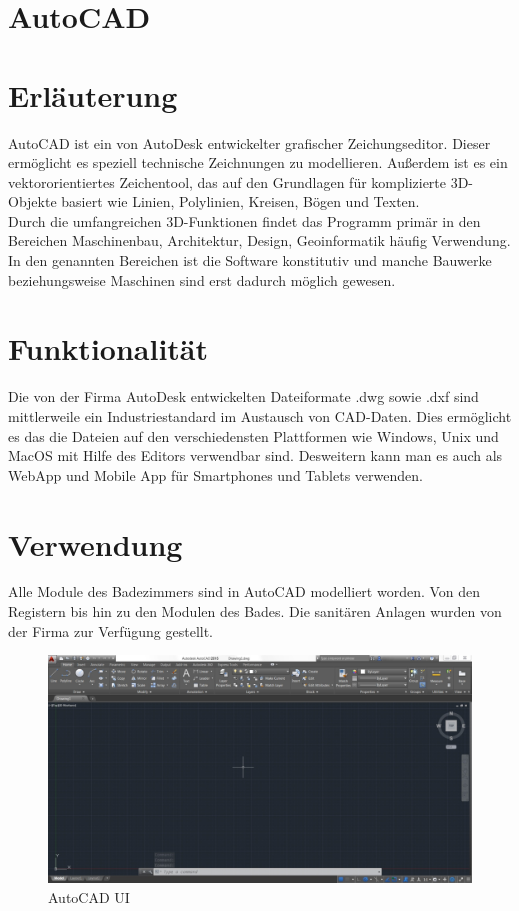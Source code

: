 \newpage
\clearpage

\section{AutoCAD}

\section*{Erläuterung}
AutoCAD ist ein von AutoDesk entwickelter grafischer Zeichungseditor. Dieser ermöglicht es speziell technische Zeichnungen zu modellieren. Außerdem ist es ein vektororientiertes Zeichentool, das auf den Grundlagen für komplizierte 3D-Objekte basiert wie Linien, Polylinien, Kreisen, Bögen und Texten.
\\
Durch die umfangreichen 3D-Funktionen findet das Programm primär in den Bereichen Maschinenbau, Architektur, Design, Geoinformatik häufig Verwendung. In den genannten Bereichen ist die Software konstitutiv und manche Bauwerke beziehungsweise Maschinen sind erst dadurch möglich gewesen.

\section*{Funktionalität}
Die von der Firma AutoDesk entwickelten Dateiformate .dwg sowie .dxf sind mittlerweile ein Industriestandard im Austausch von CAD-Daten. Dies ermöglicht es das die Dateien auf den verschiedensten Plattformen wie Windows, Unix und MacOS mit Hilfe des Editors verwendbar sind. Desweitern kann man es auch als WebApp und Mobile App für Smartphones und Tablets verwenden.

\section*{Verwendung}
Alle Module des Badezimmers sind in AutoCAD modelliert worden. Von den Registern bis hin zu den Modulen des Bades. Die sanitären Anlagen wurden von der Firma {\projectpartner} zur Verfügung gestellt.



\newpage

\begin{figure}
	\begin{center}
		\includegraphics[width=16cm]{images/AutoCAD_UI.jpg}
		\caption{AutoCAD UI ~\cite{autocad}}
	\end{center}
\end{figure}


